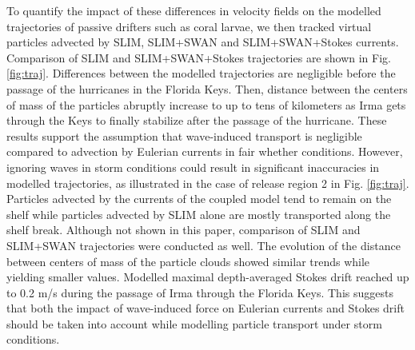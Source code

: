 \documentclass[11pt,a4paper]{article}
\begin{document}
To quantify the impact of these differences in velocity fields on the modelled trajectories of passive drifters such as coral larvae, we then tracked virtual particles advected by SLIM, SLIM+SWAN and SLIM+SWAN+Stokes currents. Comparison of SLIM and SLIM+SWAN+Stokes trajectories are shown in Fig. \ref{fig:traj}. Differences between the modelled trajectories are negligible before the passage of the hurricanes in the Florida Keys. Then, distance between the centers of mass of the particles abruptly increase to up to tens of kilometers as Irma gets through the Keys to finally stabilize after the passage of the hurricane. These results support the assumption that wave-induced transport is negligible compared to advection by Eulerian currents in fair whether conditions. However, ignoring waves in storm conditions could result in significant inaccuracies in modelled trajectories, as illustrated in the case of release region 2 in Fig. \ref{fig:traj}. Particles advected by the currents of the coupled model tend to remain on the shelf while particles advected by SLIM alone are mostly transported along the shelf break. Although not shown in this paper, comparison of SLIM and SLIM+SWAN trajectories were conducted as well. The evolution of the distance between centers of mass of the particle clouds showed similar trends while yielding smaller values. Modelled maximal depth-averaged Stokes drift reached up to 0.2 m/s during the passage of Irma through the Florida Keys. This suggests that both the impact of wave-induced force on Eulerian currents and Stokes drift should be taken into account while modelling particle transport under storm conditions. 
\end{document}
